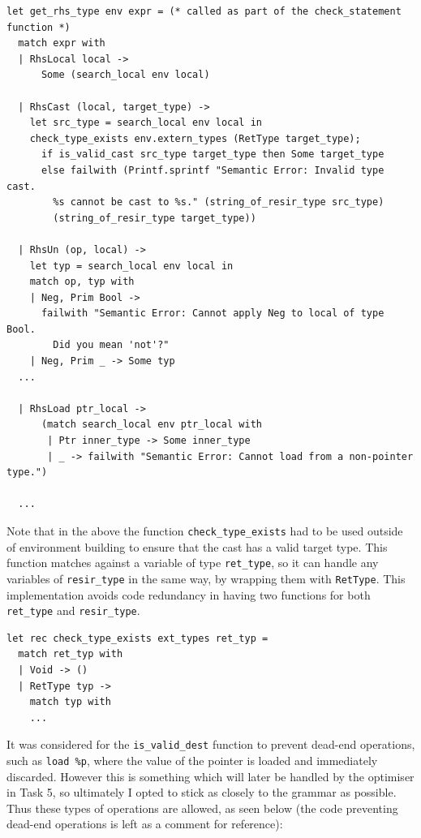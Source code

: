 \documentclass[11pt, a4paper]{article}
\begin{document}
\medskip

\begin{lstlisting}[language={[Objective]Caml}]
let get_rhs_type env expr = (* called as part of the check_statement function *)
  match expr with
  | RhsLocal local ->
      Some (search_local env local)

  | RhsCast (local, target_type) ->
    let src_type = search_local env local in
    check_type_exists env.extern_types (RetType target_type);
      if is_valid_cast src_type target_type then Some target_type
      else failwith (Printf.sprintf "Semantic Error: Invalid type cast. 
        %s cannot be cast to %s." (string_of_resir_type src_type) 
        (string_of_resir_type target_type))

  | RhsUn (op, local) ->
    let typ = search_local env local in 
    match op, typ with
    | Neg, Prim Bool ->
      failwith "Semantic Error: Cannot apply Neg to local of type Bool. 
        Did you mean 'not'?"
    | Neg, Prim _ -> Some typ
  ... 

  | RhsLoad ptr_local ->
      (match search_local env ptr_local with
       | Ptr inner_type -> Some inner_type
       | _ -> failwith "Semantic Error: Cannot load from a non-pointer type.")

  ...

\end{lstlisting}

\medskip

Note that in the above the function \texttt{check\_type\_exists} had to be used outside of environment building to ensure that the cast has a valid target type. This function
matches against a variable of type \texttt{ret\_type}, so it can handle any variables of \texttt{resir\_type} in the same way, by wrapping them with \texttt{RetType}. This implementation
avoids code redundancy in having two functions for both \texttt{ret\_type} and \texttt{resir\_type}.

\medskip

\begin{lstlisting}[language={[Objective]Caml}]
let rec check_type_exists ext_types ret_typ =
  match ret_typ with
  | Void -> ()
  | RetType typ -> 
    match typ with
    ...
\end{lstlisting}

\medskip

It was considered for the \texttt{is\_valid\_dest} function to prevent dead-end operations, such as \texttt{load \%p}, where the value of the pointer is loaded and immediately discarded.
However this is something which will later be handled by the optimiser in Task 5, so 
ultimately I opted to stick as closely to the grammar as possible. Thus these types of operations are allowed, as seen below (the code preventing dead-end operations is left as a comment
for reference):
\end{document}
